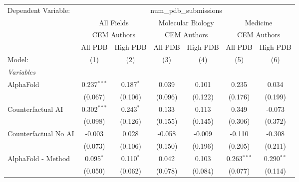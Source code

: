 \begingroup
\centering
\begin{tabular}{lcccccc}
   \tabularnewline \midrule \midrule
   Dependent Variable: & \multicolumn{6}{c}{num\_pdb\_submissions}\\
 & \multicolumn{2}{c}{All Fields} & \multicolumn{2}{c}{Molecular Biology} & \multicolumn{2}{c}{Medicine} \\
\cmidrule(lr){2-3} \cmidrule(lr){4-5} \cmidrule(lr){6-7}
 & \multicolumn{2}{c}{CEM Authors} & \multicolumn{2}{c}{CEM Authors} & \multicolumn{2}{c}{CEM Authors} \\
\cmidrule(lr){2-3} \cmidrule(lr){4-5} \cmidrule(lr){6-7}
 & \multicolumn{1}{c}{All PDB} & \multicolumn{1}{c}{High PDB} & \multicolumn{1}{c}{All PDB} & \multicolumn{1}{c}{High PDB} & \multicolumn{1}{c}{All PDB} & \multicolumn{1}{c}{High PDB} \\
\cmidrule(lr){2-2} \cmidrule(lr){3-3} \cmidrule(lr){4-4} \cmidrule(lr){5-5} \cmidrule(lr){6-6} \cmidrule(lr){7-7}
   Model:                                                     & (1)           & (2)          & (3)     & (4)           & (5)            & (6)\\  
   \midrule
   \emph{Variables}\\
   AlphaFold                                                  & 0.237$^{***}$ & 0.187$^{*}$  & 0.039   & 0.101         & 0.235          & 0.034\\   
                                                              & (0.067)       & (0.106)      & (0.096) & (0.122)       & (0.176)        & (0.199)\\   
   Counterfactual AI                                          & 0.302$^{***}$ & 0.243$^{*}$  & 0.133   & 0.113         & 0.349          & -0.073\\   
                                                              & (0.098)       & (0.126)      & (0.155) & (0.145)       & (0.306)        & (0.372)\\   
   Counterfactual No AI                                       & -0.003        & 0.028        & -0.058  & -0.009        & -0.110         & -0.308\\   
                                                              & (0.073)       & (0.106)      & (0.150) & (0.196)       & (0.205)        & (0.211)\\   
   AlphaFold - Method                                         & 0.095$^{*}$   & 0.110$^{*}$  & 0.042   & 0.103         & 0.263$^{***}$  & 0.290$^{**}$\\   
                                                              & (0.050)       & (0.062)      & (0.078) & (0.084)       & (0.077)        & (0.114)\\   

\end{tabular}
